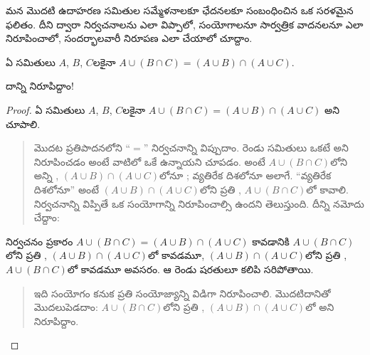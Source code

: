 \documentclass[../../../include/open-logic-section]{subfiles}
\begin{document}


మన మొదటి ఉదాహరణ సమితుల సమ్మేళనాలకూ ఛేదనలకూ సంబంధించిన ఒక సరళమైన ఫలితం. దీని ద్వారా నిర్వచనాలను ఎలా విప్పాలో, సంయోగాలనూ సార్వత్రిక వాదనలనూ ఎలా నిరూపించాలో, సందర్భాలవారీ నిరూపణ ఎలా చేయాలో చూద్దాం.

\begin{prop}
ఏ సమితులు $A$, $B$, $C$లకైనా $A \cup (B \cap C) = (A \cup B)
\cap (A \cup C)$.
\end{prop}

దాన్ని నిరూపిద్దాం!{}

\begin{proof}
ఏ సమితులు $A$, $B$, $C$లకైనా $A \cup (B \cap
C) = (A \cup B) \cap (A \cup C)$ అని చూపాలి.
\begin{quote}
మొదట ప్రతిపాదనలోని ``$=$'' నిర్వచనాన్ని విప్పుదాం. రెండు సమితులు ఒకటే అని నిరూపించడం అంటే వాటిలో ఒకే  ఉన్నాయని చూపడం. అంటే $A \cup
(B \cap C)$లోని అన్ని , $(A \cup B) \cap (A \cup C)$లోనూ ; వ్యతిరేక దిశలోనూ అలాగే. ``వ్యతిరేక దిశలోనూ'' అంటే $(A
\cup B) \cap (A \cup C)$లోని ప్రతి , $A \cup (B \cap
C)$లో  కావాలి. నిర్వచనాన్ని విప్పితే ఒక సంయోగాన్ని నిరూపించాల్సి ఉందని తెలుస్తుంది. దీన్ని నమోదు చేద్దాం:
\end{quote}
నిర్వచనం ప్రకారం $A \cup (B \cap C) = (A \cup B) \cap (A \cup C)$ కావడానికి $A \cup (B \cap C)$లోని ప్రతి , $(A
\cup B) \cap (A \cup C)$లో  కావడమూ, $(A \cup B) \cap (A
\cup C)$లోని ప్రతి , $A \cup (B \cap C)$లో  కావడమూ అవసరం. ఆ రెండు షరతులూ కలిపి సరిపోతాయి.
\begin{quote}
ఇది సంయోగం కనుక ప్రతి సంయోజ్యాన్ని విడిగా నిరూపించాలి. మొదటిదానితో మొదలుపెడదాం: $A \cup (B \cap C)$లోని ప్రతి , $(A
\cup B) \cap (A \cup C)$లో  అని నిరూపిద్దాం.


\end{quote}
\end{proof}
\end{document}
